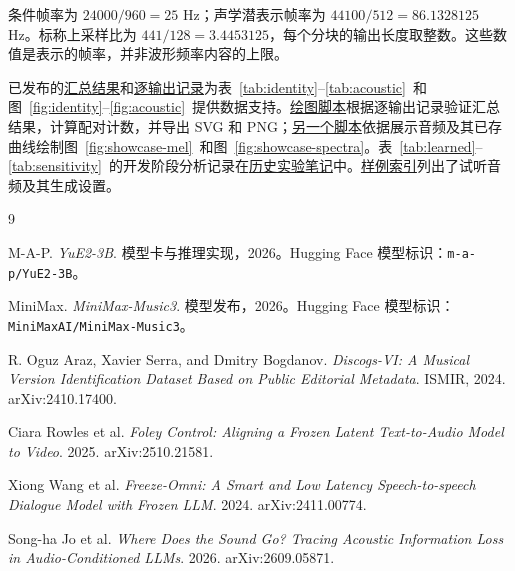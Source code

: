 \documentclass[11pt,a4paper,fontset=fandol]{ctexart}
\newcommand{\code}[1]{\texttt{#1}}
\begin{document}
条件帧率为 $24000/960 = 25$ Hz；声学潜表示帧率为 $44100/512 = 86.1328125$ Hz。标称上采样比为 $441/128 = 3.4453125$，每个分块的输出长度取整数。这些数值是表示的帧率，并非波形频率内容的上限。

已发布的\href{https://github.com/HenryZ838978/fugue/blob/main/research/eval_summary.json}{汇总结果}和\href{https://github.com/HenryZ838978/fugue/blob/main/research/eval_per_item.json}{逐输出记录}为表~\ref{tab:identity}--\ref{tab:acoustic}~和图~\ref{fig:identity}--\ref{fig:acoustic}~提供数据支持。\href{https://github.com/HenryZ838978/fugue/blob/main/paper/figures/render_figures.py}{绘图脚本}根据逐输出记录验证汇总结果，计算配对计数，并导出 SVG 和 PNG；\href{https://github.com/HenryZ838978/fugue/blob/main/paper/figures/render_showcase.py}{另一个脚本}依据展示音频及其已存曲线绘制图~\ref{fig:showcase-mel}~和图~\ref{fig:showcase-spectra}。表~\ref{tab:learned}--\ref{tab:sensitivity}~的开发阶段分析记录在\href{https://github.com/HenryZ838978/fugue/blob/main/research/SCION.md}{历史实验笔记}中。\href{https://github.com/HenryZ838978/fugue/blob/main/samples/README.md}{样例索引}列出了试听音频及其生成设置。

\begin{thebibliography}{9}
\small\raggedright\setlength{\itemsep}{2pt}
 M-A-P. \emph{YuE2-3B}. 模型卡与推理实现，2026。Hugging Face 模型标识：\code{m-a-p/YuE2-3B}。

 MiniMax. \emph{MiniMax-Music3}. 模型发布，2026。Hugging Face 模型标识：\code{MiniMaxAI/MiniMax-Music3}。

 R. Oguz Araz, Xavier Serra, and Dmitry Bogdanov. \emph{Discogs-VI: A Musical Version Identification Dataset Based on Public Editorial Metadata}. ISMIR, 2024. arXiv:2410.17400.

 Ciara Rowles et al. \emph{Foley Control: Aligning a Frozen Latent Text-to-Audio Model to Video}. 2025. arXiv:2510.21581.

 Xiong Wang et al. \emph{Freeze-Omni: A Smart and Low Latency Speech-to-speech Dialogue Model with Frozen LLM}. 2024. arXiv:2411.00774.

 Song-ha Jo et al. \emph{Where Does the Sound Go? Tracing Acoustic Information Loss in Audio-Conditioned LLMs}. 2026. arXiv:2609.05871.
\end{thebibliography}
\end{document}
